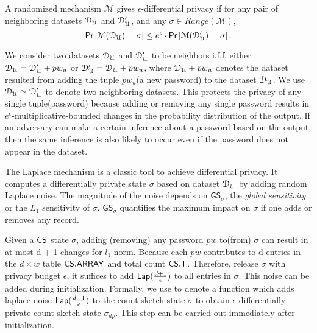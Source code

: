 \begin{definition} \label{def:diff}

	A randomized mechanism $\mathcal{M}$ gives $\epsilon$-differential privacy if for any pair of neighboring datasets $\mathcal{D}_{{\mathcal{U}}}$ and $\mathcal{D}_{{\mathcal{U}}}'$, and any $\sigma \in \mathit{Range}(\mathcal{M})$,
	$$\mathsf{Pr} \left[\mathcal{M}(\mathcal{D}_{{\mathcal{U}}})=\sigma\right]  \leq e^{\epsilon}\cdot \mathsf{Pr} \left[\mathcal{M}(\mathcal{D}_{{\mathcal{U}}}')=\sigma\right] .$$
\end{definition}


We consider two datasets $\mathcal{D}_{{\mathcal{U}}}$ and $\mathcal{D}_{{\mathcal{U}}}'$ to be neighbors i.f.f. either $\mathcal{D}_{{\mathcal{U}}}=\mathcal{D}_{{\mathcal{U}}}' + pw_u$ or $\mathcal{D}_{{\mathcal{U}}}'=\mathcal{D}_{{\mathcal{U}}} + pw_u$, where $\mathcal{D}_{{\mathcal{U}}} +pw_u$ denotes the dataset resulted from adding the tuple $pw_u$(a new password) to the dataset $\mathcal{D}_{{\mathcal{U}}}$. We use $\mathcal{D}_{{\mathcal{U}}}\simeq \mathcal{D}_{{\mathcal{U}}}'$ to denote two neighboring datasets. This protects the privacy of any single tuple(password) because adding or removing any single password results in $e^{\epsilon}$-multiplicative-bounded changes in the probability distribution of the output. If an adversary can make a certain inference about a password based on the output, then the same inference is also likely to occur even if the password does not appear in the dataset.

The Laplace mechanism is a classic tool to achieve differential privacy. It computes a differentially private state $\sigma$ based on dataset $\mathcal{D}_{{\mathcal{U}}}$ by adding random Laplace noise. The magnitude of the noise depends on $\mathsf{GS}_\sigma$, the \emph{global sensitivity} or the $L_1$ sensitivity of $\sigma$.  $\mathsf{GS}_\sigma$ quantifies the maximum impact on $\sigma$ if one adds or removes any record. 


 Given a $\mathsf{CS}$ state $\sigma$, adding (removing) any password $pw$ to(from) $\sigma$ can result in at most d + 1 changes for $l_1$ norm. Because each $pw$ contributes to d entries in the $d \times w$ table $\mathsf{CS.ARRAY}$ and total count $\mathsf{CS.T}$. Therefore,  release $\sigma$ with privacy budget $\epsilon$, it suffices to add $\mathsf{Lap}(\frac{d+1}{\epsilon})$ to all entries in $\sigma$. This noise can be added during initialization. Formally, we use  to denote a function which adds laplace noise $\mathsf{Lap}(\frac{d+1}{\epsilon})$  to the count sketch state $\sigma$ to obtain $\epsilon$-differentially private count sketch state $\sigma_{dp}$. This step can be carried out immediately after initialization. 

